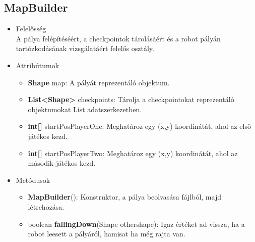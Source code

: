\subsection{MapBuilder}
\begin{itemize}
\item Felelősség\\
A pálya felépítéséért, a checkpointok tárolásáért és a robot pályán tartózkodásának vizsgálatáért felelős osztály.
\item Attribútumok
	\begin{itemize}
		\item \textbf{Shape} map: A pályát reprezentáló objektum. 
		\item \textbf{List<Shape>} checkpoints: Tárolja a checkpointokat reprezentáló objektumokat List adatszerkezetben.
		\item \textbf{int[]} startPosPlayerOne: Meghatároz egy (x,y) koordinátát, ahol az első játékos kezd.
		\item \textbf{int[]} startPosPlayerTwo: Meghatároz egy (x,y) koordinátát, ahol az második játékos kezd.
	\end{itemize}
\item Metódusok
	\begin{itemize}
		\item \textbf{MapBuilder}(): Konstruktor, a pálya beolvasása fájlból, majd létrehozása.
		\item boolean \textbf{fallingDown}(Shape othershape): Igaz értéket ad vissza, ha a robot leesett a pályáról, hamisat ha még rajta van.
	\end{itemize}
\end{itemize}

